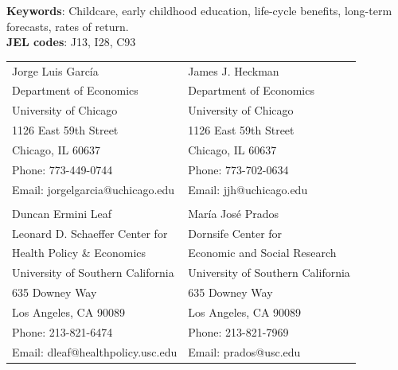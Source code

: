 \noindent \textbf{Keywords}: Childcare, early childhood education, life-cycle benefits, long-term forecasts, rates of return. \\
\noindent \textbf{JEL codes}: J13, I28, C93\\


\bigskip
\begin{tabular}{ll}
Jorge Luis Garc\'{i}a                                       & James J. Heckman \\
Department of Economics                                & Department of Economics \\
University of Chicago                                       & University of Chicago \\
1126 East 59th Street                                     & 1126 East 59th Street \\
Chicago, IL 60637                                           & Chicago, IL 60637 \\
Phone: 773-449-0744                                  & Phone: 773-702-0634  \\
Email: jorgelgarcia@uchicago.edu                       & Email: jjh@uchicago.edu \\
                                                                       & \\
Duncan Ermini Leaf                                           & Mar\'{i}a Jos\'{e} Prados \\
Leonard D. Schaeffer Center for            & Dornsife Center for  \\
Health Policy \& Economics                                          & Economic and Social Research \\
University of Southern California                        & University of Southern California \\
635 Downey Way                                             & 635 Downey Way        \\
Los Angeles, CA 90089                                    & Los Angeles, CA 90089 \\
Phone: 213-821-6474                                     & Phone: 213-821-7969 \\
Email: dleaf@healthpolicy.usc.edu                     & Email: prados@usc.edu \\

\end{tabular}

\clearpage

\restoregeometry
\doublespacing
\setcounter{page}{1}

